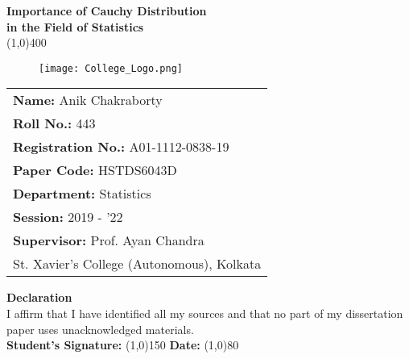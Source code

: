 \documentclass[12pt, fleqn, a4paper]{article}
\begin{document}
	\begin{titlepage}
	
	\begin{spacing}{1}
		\begin{center}
			\LARGE \textbf{Importance of Cauchy Distribution \\ in the Field of Statistics} \\[5pt]\line(1,0){400}
			\vfill%
			\begin{figure}[H] \centering
				\texttt{[image: College\_Logo.png]}
			\end{figure} \vfill
			\renewcommand{\arraystretch}{1.2} \large \centering
			\begin{tabular}{l}
				\textbf{Name:} Anik Chakraborty \\
				\textbf{Roll No.:} 443 \\
				\textbf{Registration No.:} A01-1112-0838-19 \\
				\textbf{Paper Code:} HSTDS6043D \\
				\textbf{Department:} Statistics \\ 
				\textbf{Session:} 2019 - '22 \\ 		
				\textbf{Supervisor:} Prof. Ayan Chandra \\
				St. Xavier's College (Autonomous), Kolkata
			\end{tabular}
			\vfill \raggedright\textbf{\large Declaration} \\ [10pt]
			\justifying\normalsize I affirm that I have identified all my sources and that no part of my dissertation paper uses unacknowledged materials. \\[25pt] 
			\textbf{Student's Signature:} \line(1,0){150}
			\hfill \textbf{Date:} \line(1,0){80} \\%
		\end{center}
	\end{spacing}
	\end{titlepage}
\end{document}
